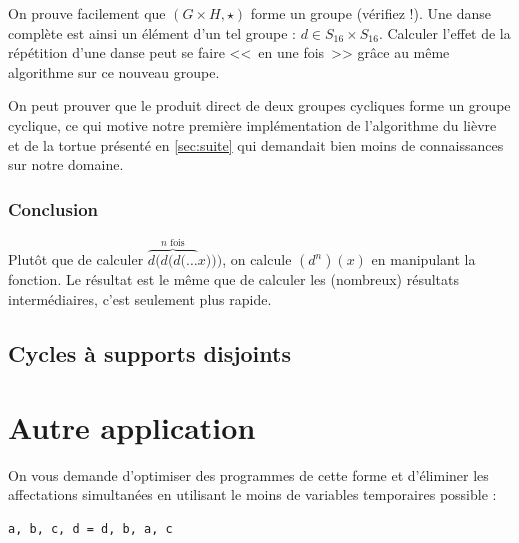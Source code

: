 \documentclass[11pt,a4paper,oneside]{book}
\begin{document}
On prouve facilement que $(G\times H, \star)$ forme un groupe (vérifiez !).
Une danse complète est ainsi un élément d'un tel groupe :
$d\in S_{16}\times S_{16}$.
Calculer l'effet de la répétition d'une danse peut se faire <<~en une fois~>>
grâce au même algorithme sur ce nouveau groupe.

On peut prouver que le produit direct de deux groupes cycliques forme un groupe
cyclique, ce qui motive notre première implémentation de l'algorithme du lièvre
et de la tortue présenté en \ref{sec:suite}
qui demandait bien moins de connaissances sur notre domaine.


\subsubsection{Conclusion}
Plutôt que de calculer $\overbrace{d(d(d(\dots}^\text{$n$ fois} x)))$,
on calcule $\left(d^n\right)(x)$ en manipulant la fonction. Le résultat est le
même que de calculer les (nombreux) résultats intermédiaires, c'est seulement
plus rapide.

\subsection{Cycles à supports disjoints}


\section{Autre application} %
On vous demande d'optimiser des programmes de cette forme et d'éliminer les
affectations simultanées en utilisant le moins de variables temporaires
possible :
\begin{verbatim}
a, b, c, d = d, b, a, c
\end{verbatim}
\end{document}

